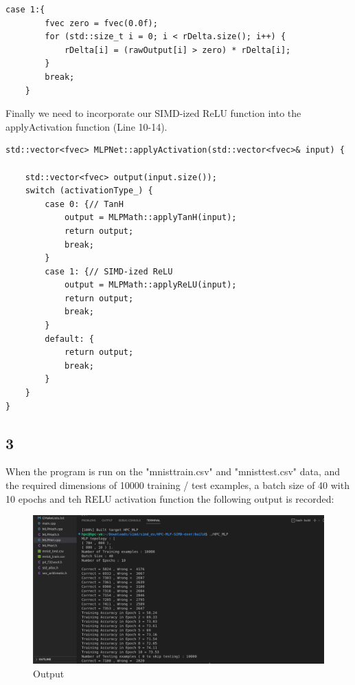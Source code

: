 \documentclass{article}
\begin{document}
\begin{lstlisting}[caption=backPropActivation]
    case 1:{
        fvec zero = fvec(0.0f);
        for (std::size_t i = 0; i < rDelta.size(); i++) {
            rDelta[i] = (rawOutput[i] > zero) * rDelta[i];
        }
        break;
    }
\end{lstlisting}

\newpage

\noindent Finally we need to incorporate our SIMD-ized ReLU function into the applyActivation function (Line 10-14).
\begin{lstlisting}[caption=applyActivation]
    std::vector<fvec> MLPNet::applyActivation(std::vector<fvec>& input) {

    std::vector<fvec> output(input.size());
    switch (activationType_) {
        case 0: {// TanH
            output = MLPMath::applyTanH(input);
            return output;
            break;
        }
        case 1: {// SIMD-ized ReLU
            output = MLPMath::applyReLU(input);
            return output;
            break;
        }
        default: {
            return output;
            break;
        }
    }
}
\end{lstlisting}


\subsection*{3}
When the program is run on the "mnisttrain.csv" and "mnisttest.csv" data, and the required dimensions of 10000 training / test examples, a batch size of 40 with 10 epochs and teh RELU activation function the following output is recorded: \\

\begin{figure}[H]
    \centering
    \includegraphics[scale=0.5]{ex_03_output.png} 
    \caption{Output}
    \label{fig:example}
  \end{figure}
\end{document}
